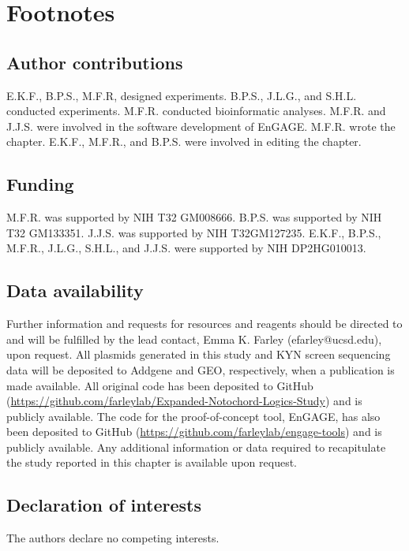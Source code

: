 \section{Footnotes}

\subsection{Author contributions}
E.K.F., B.P.S., M.F.R, designed experiments. B.P.S., J.L.G., and S.H.L. conducted experiments. M.F.R. conducted bioinformatic analyses. M.F.R. and J.J.S. were involved in the software development of EnGAGE. M.F.R. wrote the chapter. E.K.F., M.F.R., and B.P.S. were involved in editing the chapter. 

\subsection{Funding}
M.F.R. was supported by NIH T32 GM008666. B.P.S. was supported by NIH T32 GM133351. J.J.S. was supported by NIH T32GM127235. E.K.F., B.P.S., M.F.R., J.L.G., S.H.L., and J.J.S. were supported by NIH DP2HG010013.

\subsection{Data availability}
Further information and requests for resources and reagents should be directed to and will be fulfilled by the lead contact, Emma K. Farley (efarley@ucsd.edu), upon request. All plasmids generated in this study and KYN screen sequencing data will be deposited to Addgene and GEO, respectively, when a publication is made available. All original code has been deposited to GitHub (\href{https://github.com/farleylab/Expanded-Notochord-Logics-Study}{https://github.com/farleylab/Expanded-Notochord-Logics-Study}) and is publicly available. The code for the proof-of-concept tool, EnGAGE, has also been deposited to GitHub (\href{https://github.com/farleylab/engage-tools}{https://github.com/farleylab/engage-tools}) and is publicly available. Any additional information or data required to recapitulate the study reported in this chapter is available upon request.

\subsection{Declaration of interests}
The authors declare no competing interests.
